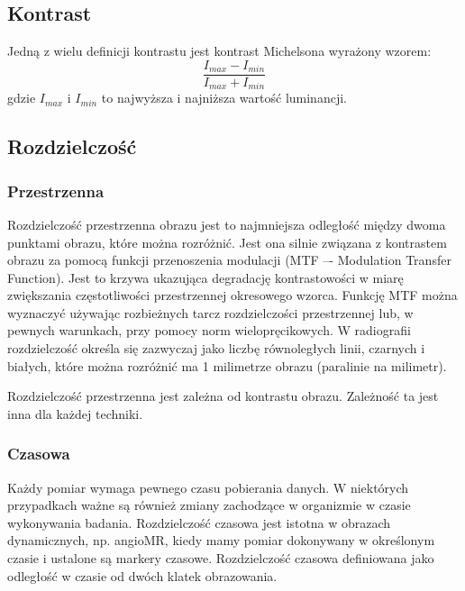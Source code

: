 


\subsection{Kontrast}

Jedną z wielu definicji kontrastu jest kontrast Michelsona wyrażony wzorem:
\[\frac{I_{max}-I_{min}}{I_{max}+I_{min}}\]
gdzie $I_{max}$ i $I_{min}$ to najwyższa i najniższa wartość luminancji.

\subsection{Rozdzielczość}

\subsubsection*{Przestrzenna}

\par
Rozdzielczość przestrzenna obrazu jest to najmniejsza odległość między dwoma punktami obrazu, które można rozróżnić.
Jest ona silnie związana z kontrastem obrazu za pomocą funkcji przenoszenia modulacji (MTF –- Modulation Transfer Function).
Jest to krzywa ukazująca degradację kontrastowości w miarę zwiększania częstotliwości przestrzennej okresowego wzorca.
Funkcję MTF można wyznaczyć używając rozbieżnych tarcz rozdzielczości przestrzennej lub, w pewnych warunkach, przy pomocy norm wielopręcikowych.
W radiografii rozdzielczość określa się zazwyczaj jako liczbę równoległych linii, czarnych i białych, które można rozróżnić ma 1 milimetrze obrazu (paralinie na milimetr).

\par
Rozdzielczość przestrzenna jest zależna od kontrastu obrazu.
Zależność ta jest inna dla każdej techniki.

\subsubsection*{Czasowa}

Każdy pomiar wymaga pewnego czasu pobierania danych.
W niektórych przypadkach ważne są również zmiany zachodzące w organizmie w czasie wykonywania badania.
Rozdzielczość czasowa jest istotna w obrazach dynamicznych, np. angioMR, kiedy mamy pomiar dokonywany w określonym czasie i ustalone są markery czasowe.
Rozdzielczość czasowa definiowana jako odległość w czasie od dwóch klatek obrazowania.

